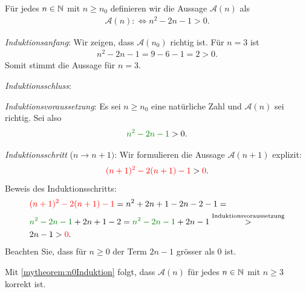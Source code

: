 \clearpage
\begin{myanswer}[myexercise:0292]
	Für jedes $n\in\mathbb{N}$ mit $n\geq n_0$ definieren wir die Aussage $\mathcal{A}(n)$ als
	\begin{align*}
		\mathcal{A}(n) :\iff n^2-2n-1 > 0.
	\end{align*}
	\begin{aenum}
		\item \textit{Induktionsanfang}: Wir zeigen, dass $\mathcal{A}(n_0)$ richtig ist. Für $n=3$ ist
		\begin{align*}
			n^2-2n-1 = 9-6-1 = 2 > 0.
		\end{align*}
		Somit stimmt die Aussage für $n=3$.
		\item \textit{Induktionsschluss}:
		\begin{renum}
			\item \textit{Induktionsvoraussetzung}: Es sei $n\geq n_0$ eine natürliche Zahl und $\mathcal{A}(n)$ sei richtig. Sei also
			\begin{align*}
				\textcolor{Green}{n^2-2n-1} > 0.
			\end{align*}
			\item \textit{Induktionsschritt} ($n\to n+1)$: Wir formulieren die Aussage $\mathcal{A}(n+1)$ explizit:
				\begin{align*}
					\textcolor{Red}{(n+1)^2-2(n+1)-1} > \textcolor{Red}{0}.
				\end{align*}
				Beweis des Induktionsschritts:
				\begin{align*}
					 & \textcolor{Red}{(n+1)^2-2(n+1)-1} = n^2 + 2n + 1 - 2n - 2 - 1 =                                                        \\
					 & \textcolor{Green}{n^2-2n-1} + 2n+1-2 = \textcolor{Green}{n^2-2n-1} + 2n-1 \stackrel{\text{Induktionsvoraussetzung}}{>} \\
					 & 2n-1 > \textcolor{Red}{0}.
				\end{align*}
				Beachten Sie, dass für $n\geq 0$ der Term $2n-1$ grösser als $0$ ist.
		\end{renum}
	\end{aenum}
	Mit \cref{mytheorem:n0Induktion} folgt, dass $\mathcal{A}(n)$ für jedes $n\in\mathbb{N}$ mit $n\geq 3$ korrekt ist.
\end{myanswer}

